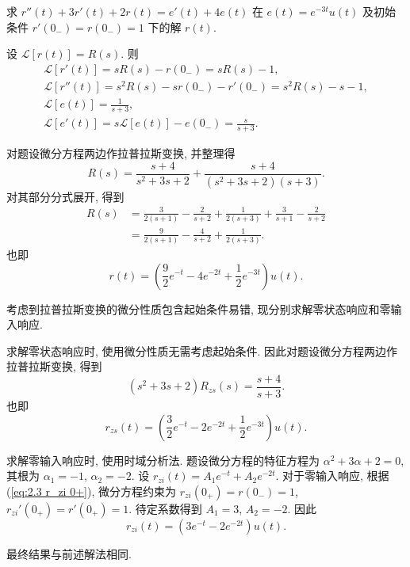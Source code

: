 \begin{exampleprob}
    求 $r''(t)+3r'(t)+2r(t)=e'(t)+4e(t)$ 在 $e(t)=e^{-3t}u(t)$ 及初始条件 $r'(0_-)=r(0_-)=1$ 下的解 $r(t)$.

    \begin{solution}[1]
        设 $\mathcal{L}[r(t)]=R(s)$. 则
        \begin{gather*}
            \mathcal{L}[r'(t)]=sR(s)-r(0_-)=sR(s)-1, \\
            \mathcal{L}[r''(t)]=s^2R(s)-sr(0_-)-r'(0_-)=s^2R(s)-s-1, \\
            \mathcal{L}[e(t)]=\frac{1}{s+3}, \\
            \mathcal{L}[e'(t)]=s\mathcal{L}[e(t)]-e(0_-)=\frac{s}{s+3}.
        \end{gather*}

        对题设微分方程两边作拉普拉斯变换, 并整理得
        \begin{equation*}
            R(s)=\frac{s+4}{s^2+3s+2}+\frac{s+4}{(s^2+3s+2)(s+3)}.
        \end{equation*}
        对其部分分式展开, 得到
        \begin{equation*}
            \begin{aligned}
                R(s) & =\frac{3}{2(s+1)}-\frac{2}{s+2}+\frac{1}{2(s+3)}+\frac{3}{s+1}-\frac{2}{s+2} \\
                     & =\frac{9}{2(s+1)}-\frac{4}{s+2}+\frac{1}{2(s+3)}.
            \end{aligned}
        \end{equation*}
        也即
        \begin{equation*}
            r(t)=\left(\frac{9}{2}e^{-t}-4e^{-2t}+\frac{1}{2}e^{-3t}\right)u(t).
        \end{equation*}
    \end{solution}

    \begin{solution}[2]
        考虑到拉普拉斯变换的微分性质包含起始条件易错, 现分别求解零状态响应和零输入响应.

        求解零状态响应时, 使用微分性质无需考虑起始条件. 因此对题设微分方程两边作拉普拉斯变换, 得到
        \begin{equation*}
            (s^2+3s+2)R_{zs}(s)=\frac{s+4}{s+3}.
        \end{equation*}
        也即
        \begin{equation*}
            r_{zs}(t)=\left(\frac{3}{2}e^{-t}-2e^{-2t}+\frac{1}{2}e^{-3t}\right)u(t).
        \end{equation*}

        求解零输入响应时, 使用时域分析法. 题设微分方程的特征方程为 $\alpha^2+3\alpha+2=0$, 其根为 $\alpha_1=-1$, $\alpha_2=-2$. 设 $r_{zi}(t)=A_1e^{-t}+A_2e^{-2t}$. 对于零输入响应, 根据 (\ref{eq:2.3 r_zi 0+}), 微分方程约束为 $r_{zi}(0_+)=r(0_-)=1$, $r_{zi}'(0_+)=r'(0_+)=1$. 待定系数得到 $A_1=3$, $A_2=-2$. 因此
        \begin{equation*}
            r_{zi}(t)=(3e^{-t}-2e^{-2t})u(t).
        \end{equation*}

        最终结果与前述解法相同.
    \end{solution}
\end{exampleprob}

